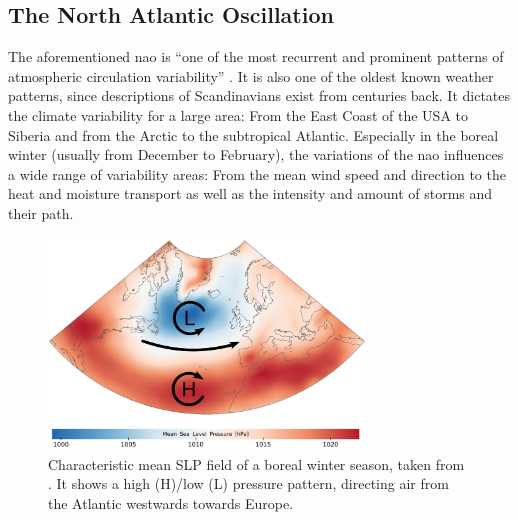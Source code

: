 \subsection{The North Atlantic Oscillation}
\label{sec:nao}


The aforementioned \ac{nao} is \enquote{one of the most recurrent and prominent patterns of atmospheric circulation variability} \cite{hurrell_overview_2003}. 
It is also one of the oldest known weather patterns, since descriptions of Scandinavians exist from centuries back. 
It dictates the climate variability for a large area: From the East Coast of the USA to Siberia and from the Arctic to the subtropical Atlantic.
Especially in the boreal winter (usually from December to February), the variations of the \ac{nao} influences a wide range of variability areas: From the mean wind speed and direction to the heat and moisture transport as well as the intensity and amount of storms and their path. \cite{hurrell_overview_2003}

\begin{figure}[htb]
  \begin{center}
    \includegraphics[width=0.75\textwidth]{figures/nao_pattern_diss.png}
  \end{center}
  \caption{Characteristic mean SLP field of a boreal winter season, taken from \cite{vietinghoffdiss}. It shows a high (H)/low (L) pressure pattern, directing air from the Atlantic westwards towards Europe. }
  \label{fig:naopattern}
\end{figure}


